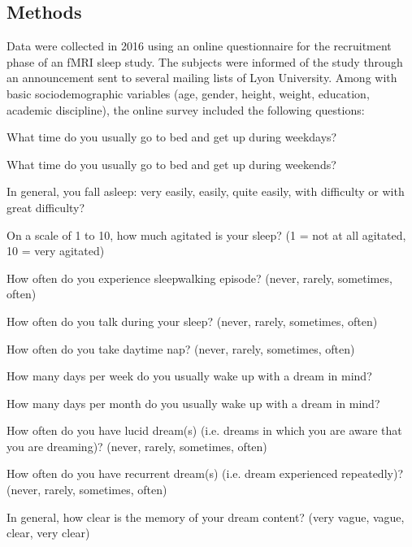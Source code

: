 \subsection*{Methods}
\label{res:survey:methods}

Data were collected in 2016 using an online questionnaire for the recruitment phase of an fMRI sleep study. The subjects were informed of the study through an announcement sent to several mailing lists of Lyon University. Among with basic sociodemographic variables (age, gender, height, weight, education, academic discipline), the online survey included the following questions:

\begin{my_list_num}
    \item What time do you usually go to bed and get up during weekdays?
    \item What time do you usually go to bed and get up during weekends?
    \item In general, you fall asleep: very easily, easily, quite easily, with difficulty or with great difficulty?
    \item On a scale of 1 to 10, how much agitated is your sleep? (1 = not at all agitated, 10 = very agitated)
    \item How often do you experience sleepwalking episode? (never, rarely, sometimes, often)
    \item How often do you talk during your sleep? (never, rarely, sometimes, often)
    \item How often do you take daytime nap? (never, rarely, sometimes, often)
    \item How many days per week do you usually wake up with a dream in mind?
    \item How many days per month do you usually wake up with a dream in mind?
    \item How often do you have lucid dream(s) (i.e. dreams in which you are aware that you are dreaming)? (never, rarely, sometimes, often)
    \item How often do you have recurrent dream(s) (i.e. dream experienced repeatedly)? (never, rarely, sometimes, often)
    \item In general, how clear is the memory of your dream content? (very vague, vague, clear, very clear)
\end{my_list_num}

